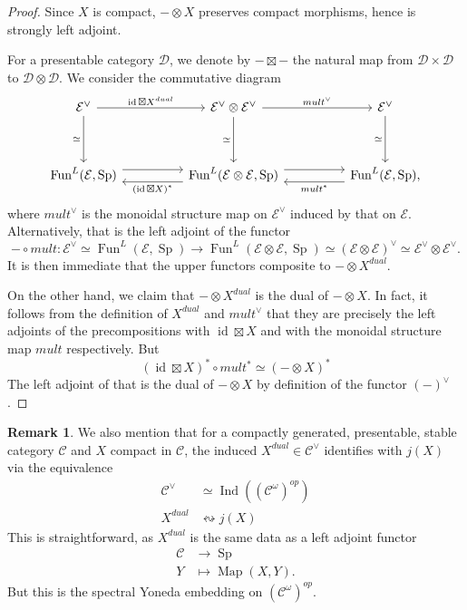 \documentclass{article}
\theoremstyle{definition}
\newtheorem{rmk}[thm]{Remark}
\newcommand{\on}{\operatorname}
\begin{document}
\begin{proof}
Since $X$ is compact, $-\otimes X$ preserves compact morphisms, hence is strongly left adjoint.


For a presentable category $\mathcal{D}$, we denote by $-\boxtimes-$ the natural map from $\mathcal{D}\times\mathcal{D}$ to $\mathcal{D}\otimes\mathcal{D}$. We consider the commutative diagram
\[\begin{tikzcd}
	{\mathcal{E}^\vee} && {\mathcal{E}^\vee\otimes\mathcal{E}^\vee} && {\mathcal{E}^\vee} \\
	\\
	{\operatorname{Fun}^L(\mathcal{E},\operatorname{Sp})} && {\operatorname{Fun}^L(\mathcal{E}\otimes\mathcal{E},\operatorname{Sp})} && {\operatorname{Fun}^L(\mathcal{E},\operatorname{Sp})}
	\arrow["{\operatorname{id}\boxtimes X^{dual}}", from=1-1, to=1-3]
	\arrow["\simeq"', from=1-1, to=3-1]
	\arrow["{mult^\vee}", from=1-3, to=1-5]
	\arrow["\simeq"', from=1-3, to=3-3]
	\arrow["\simeq"', from=1-5, to=3-5]
	\arrow[shift left=2, from=3-1, to=3-3]
	\arrow["{(\operatorname{id}\boxtimes X)^\ast}", shift left=2, from=3-3, to=3-1]
	\arrow[shift left=2, from=3-3, to=3-5]
	\arrow["{mult^\ast}", shift left=2, from=3-5, to=3-3],
\end{tikzcd}\]
where $mult^\vee$ is the monoidal structure map on $\mathcal{E}^\vee$ induced by that on $\mathcal{E}$. Alternatively, that is the left adjoint of the functor\[
-\circ mult: \mathcal{E}^\vee\simeq\on{Fun}^L(\mathcal{E},\on{Sp})\rightarrow\on{Fun}^L(\mathcal{E}\otimes\mathcal{E},\on{Sp})\simeq(\mathcal{E}\otimes\mathcal{E})^\vee\simeq\mathcal{E}^\vee\otimes\mathcal{E}^\vee.\] It is then immediate that the upper functors composite to $-\otimes X^{dual}$.


On the other hand, we claim that $-\otimes X^{dual}$ is the dual of $-\otimes X$. In fact, it follows from the definition of $X^{dual}$ and $mult^\vee$ that they are precisely the left adjoints of the precompositions with $\on{id}\boxtimes X$ and with the monoidal structure map $mult$ respectively. But\[
(\on{id}\boxtimes X)^\ast\circ mult^\ast\simeq (-\otimes X)^\ast\]
The left adjoint of that is the dual of $-\otimes X$ by definition of the functor $(-)^\vee$.
\end{proof}
\begin{rmk}\label{dual.comp}
We also mention that for a compactly generated, presentable, stable category $\mathcal{C}$ and $X$ compact in $\mathcal{C}$, the induced $X^{dual}\in\mathcal{C}^\vee$ identifies with $j(X)$ via the equivalence\[
\begin{aligned}
\mathcal{C}^\vee&\simeq\on{Ind}((\mathcal{C}^\omega)^{op})\\
X^{dual}&\leftrightsquigarrow j(X)
\end{aligned}\]
This is straightforward, as $X^{dual}$ is the same data as a left adjoint functor\[\begin{aligned}
\mathcal{C}&\rightarrow\on{Sp}\\
Y&\mapsto\on{Map}(X,Y).
\end{aligned}\]
But this is the spectral Yoneda embedding on $(\mathcal{C}^\omega)^{op}$.
\end{rmk}
\end{document}
